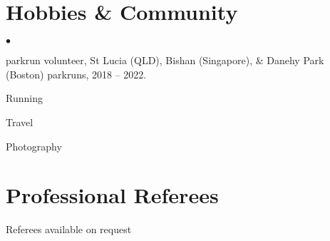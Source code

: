 \documentclass[margin,line]{resume}
\newenvironment{list2}{
  \begin{list}{$\bullet$}{%
      \setlength{\itemsep}{0in}
      \setlength{\parsep}{0in} \setlength{\parskip}{0in}
      \setlength{\topsep}{0in} \setlength{\partopsep}{0in}
      \setlength{\leftmargin}{0.2in}}}{\end{list}}
\begin{document}
\begin{resume}
\section{\sc Hobbies \& Community}
\begin{list2}
\item parkrun volunteer, St Lucia (QLD), Bishan (Singapore), \& Danehy Park (Boston) parkruns, 2018 -- 2022.
\item Running
\item Travel
\item Photography
\end{list2}

\section{\sc Professional Referees}
Referees available on request


\end{resume}
\end{document}
